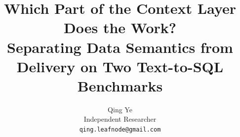 \documentclass[10pt,twocolumn]{article}
\title{\vspace{-2em}\bfseries Which Part of the Context Layer Does the Work?\\
\large Separating Data Semantics from Delivery on Two Text-to-SQL Benchmarks}
\author{
  Qing Ye\\
  \small Independent Researcher\\
  \small\texttt{qing.leafnode@gmail.com}
}
\date{}
\begin{document}
\raggedbottom
\maketitle

\begin{abstract}

\end{abstract}












\label{end:content}




\ifextended
\appendix












\fi
\end{document}
